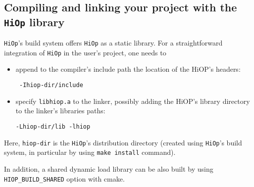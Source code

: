\documentclass[11pt]{article}
\newcommand{\Hi}{\texttt{HiOp}\xspace}
\begin{document}


\subsection{Compiling and linking your project with the \Hi library}
\Hi's build system offers \Hi as a static library. For a straightforward integration of \Hi in the user's project, one needs  to
\begin{itemize}
\item append to the compiler's include path the location of the HiOP's headers: \begin{verbatim} -Ihiop-dir/include \end{verbatim}
\item specify \texttt{libhiop.a} to the linker, possibly adding the HiOP's library directory to the linker's libraries paths: 
\begin{verbatim}-Lhiop-dir/lib -lhiop\end{verbatim} \end{itemize}
Here, \texttt{hiop-dir} is the \Hi's distribution directory  (created using \Hi's build system, in particular   by using \texttt{make install} command).

In addition, a shared dynamic load library can be also built by using \texttt{HIOP\_BUILD\_SHARED} option with cmake. 

\end{document}
